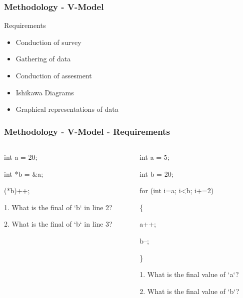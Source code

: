 \documentclass[handout]{beamer}
\begin{document}
\begin{frame}
	\frametitle{Methodology - V-Model}
	\begin{block}{Requirements}
		\begin{itemize}
			\item<1-> Conduction of survey
			\item<2-> Gathering of data
			\item<3-> Conduction of assesment
		\end{itemize}

		\begin{itemize}
			\item<4-> Ishikawa Diagrams
			\item<5-> Graphical representations of data
		\end{itemize}
	\end{block}
\end{frame}

\begin{frame}
	\frametitle{Methodology - V-Model - Requirements}

	\begin{columns}
		\begin{column}{.5\linewidth}
			\begin{semiverbatim}
				int a = 20;

				int *b = \&a;

				(*b)++;

				1. What is the final of `b` in line 2?

				2. What is the final of `b` in line 3?
			\end{semiverbatim}
		\end{column}

		\begin{column}{.5\linewidth}
			\begin{semiverbatim}
				int a = 5;

				int b = 20;

				for (int i=a; i<b; i+=2)

				\{

						a++;

						b--;

				\}

				1. What is the final value of `a`?

				2. What is the final value of `b`?
			\end{semiverbatim}
		\end{column}
	\end{columns}
\end{frame}
\end{document}
